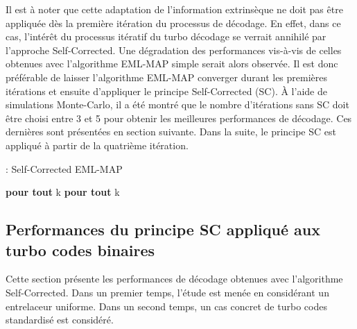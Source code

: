 Il est à noter que cette adaptation de l'information extrinsèque ne doit pas être appliquée dès la première itération 
du processus de décodage. En effet, dans ce cas, l’intérêt du processus itératif du turbo décodage se verrait annihilé par l'approche Self-Corrected.
Une dégradation des performances vis-à-vis de celles obtenues avec l'algorithme EML-MAP simple serait alors observée.
Il est donc préférable de laisser l'algorithme EML-MAP converger durant les premières itérations et ensuite d'appliquer le principe 
Self-Corrected (SC). À l'aide de simulations Monte-Carlo, il a été montré que le nombre d'itérations sans SC doit être 
choisi entre 3 et 5 pour obtenir les meilleures performances de décodage. Ces dernières sont présentées en section suivante.
Dans la suite, le principe SC est appliqué à partir de la quatrième itération.

\begin{center}
\begin{minipage}{.6\textwidth}%
\begin{algorithm}[H]
\caption{: Self-Corrected EML-MAP}
\label{alg:sc1}
\begin{algorithmic}
\State {}
 \textbf{pour tout} k
\EndIf
\EndIf
\State {}
 \textbf{pour tout} k
\EndIf
\EndIf
\EndFor
\end{algorithmic}
\end{algorithm}
\end{minipage}
\end{center}

\subsection{Performances du principe SC appliqué aux turbo codes binaires}
Cette section présente les performances de décodage obtenues avec l'algorithme Self-Corrected. Dans un premier temps, 
l'étude est menée en considérant un entrelaceur uniforme. Dans un second temps, un cas concret de turbo codes standardisé est considéré.
